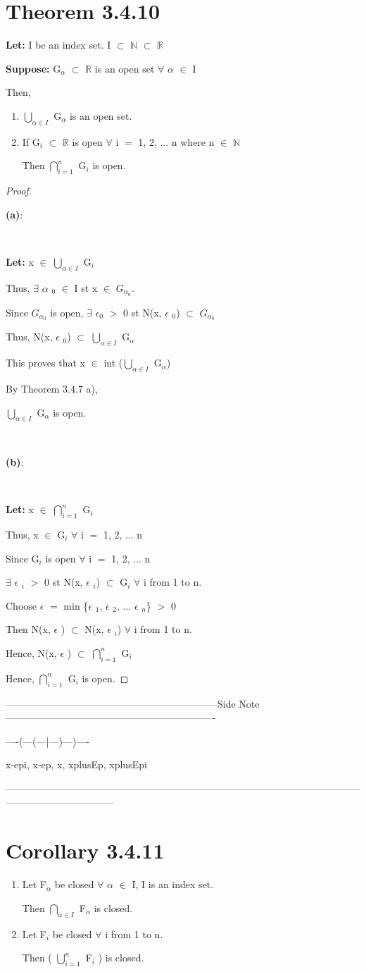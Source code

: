\documentclass{article}
\newcommand{\mt}[1]{\ensuremath{#1}}
\newcommand\bsc[2][\DefaultOpt]{%
  \def\DefaultOpt{#2}%
  \section[#1]{#2}%
}
\newcommand{\bgpf}{\begin{proof} $ $\newline}
\newcommand{\balist}{\begin{enumerate}[label=\alph*.]}
\newcommand{\elist}{\end{enumerate}}
\newcommand{\lt}[1]{\textbf{Let: } #1}
\newcommand{\supp}[1]{\textbf{Suppose: } #1}
\newcommand{\bpth}[1]{\textbf{(#1)}}
\newcommand{\epf}{\end{proof}}
\newcommand{\dbs}[3]{\mt{#1_{#2_#3}}}
\newcommand{\sidenote}[1]{-----------------------------------------------------------------Side Note----------------------------------------------------------------
#1 \

---------------------------------------------------------------------------------------------------------------------------------------------}
\newcommand{\br}{\mt{\mathbb{R}} }       %
\newcommand{\bn}{\mt{\mathbb{N}} }       %
\newcommand{\ep}{\mt{\epsilon} }         %
\newcommand{\fa}{\mt{\forall} }          %
\newcommand{\afa}{\mt{\alpha} }
\newcommand{\mem}{\mt{\in} }
\newcommand{\exs}{\mt{\exists} }
\newcommand{\sbs}{\mt{\subset} }         %
\newcommand{\eql}{\mt{=} }
\newcommand{\uw}[2]{#1\mt{_{#2}}}
\newcommand{\urng}[2]{\mt{\bigcup_{#1}^{#2}}}
\newcommand{\nrng}[2]{\mt{\bigcap_{#1}^{#2}}}
\begin{document}
\bsc{Theorem 3.4.10}{

\lt{I be an index set. I \sbs \bn \sbs \br}

\supp{\uw{G}{\afa} \sbs \br is an open set \fa \afa \mem I}

Then, 

\balist
\item \urng{\afa \mem I}{} \uw{G}{\afa} is an open set.
\item If \uw{G}{i} \sbs \br is open \fa i \eql 1, 2, ... n where n \mem \bn
	
	Then \nrng{i = 1}{n} \uw{G}{i} is open.
\elist

\bgpf

\bpth{a}: \

\

\lt{x \mem \urng{\afa \mem I}{} \uw{G}{i}}

Thus, \exs \uw{\afa}{0} \mem I st x \mem \dbs{G}{\afa}{0}.

Since \dbs{G}{\afa}{0} is open, \exs \uw{$\epsilon$}{0} $>$ 0 st N(x, \uw{\ep}{0}) \sbs \dbs{G}{\afa}{0}

Thus, N(x, \uw{\ep}{0}) \sbs \urng{\afa \mem I}{} \uw{G}{\afa}

This proves that x \mem int (\urng{\afa \mem I}{} \uw{G}{\afa})

By Theorem 3.4.7 a),

\urng{\afa \mem I}{} \uw{G}{\afa} is open. \

\

\bpth{b}: \

\

\lt{x \mem \nrng{i = 1}{n} \uw{G}{i}}

Thus, x \mem \uw{G}{i} \fa i \eql 1, 2, ... n

Since \uw{G}{i} is open \fa i \eql 1, 2, ... n

\exs \uw{\ep}{i} $>$ 0 st N(x, \uw{\ep}{i}) \sbs \uw{G}{i}  \fa i from 1 to n.

Choose \ep \eql min \{\uw{\ep}{1}, \uw{\ep}{2}, ... \uw{\ep}{n}\} $>$ 0

Then N(x, \ep) \sbs N(x, \uw{\ep}{i}) \fa i from 1 to n.

Hence, N(x, \ep) \sbs \nrng{i = 1}{n} \uw{G}{i}

Hence, \nrng{i = 1}{n} \uw{G}{i} is open.
\epf

\sidenote{
----(---(---|---)---)----

x-epi, x-ep, x, xplusEp, xplusEpi
}

}

\bsc{Corollary 3.4.11}{

\balist
\item Let \uw{F}{\afa} be closed \fa \afa \mem I, I is an index set.

	Then \nrng{\afa \mem I}{} \uw{F}{\afa} is closed.
\item Let \uw{F}{i} be closed \fa i from 1 to n.
	
	Then ( \urng{i = 1}{n} \uw{F}{i} ) is closed.

\elist

}
\end{document}
